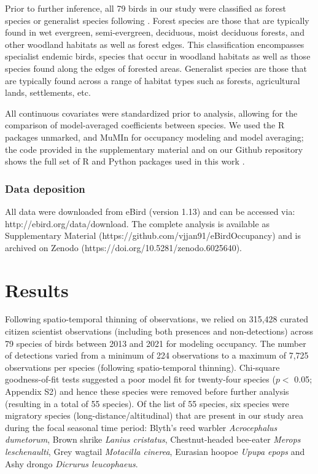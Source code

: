 Prior to further inference, all 79 birds in our study were classified as forest species or generalist species following \citep{ali1983a}.
Forest species are those that are typically found in wet evergreen, semi-evergreen, deciduous, moist deciduous forests, and other woodland habitats as well as forest edges.
This classification encompasses specialist endemic birds, species that occur in woodland habitats as well as those species found along the edges of forested areas.
Generalist species are those that are typically found across a range of habitat types such as forests, agricultural lands, settlements, etc.

All continuous covariates were standardized prior to analysis, allowing for the comparison of model-averaged coefficients between species.
We used the R packages unmarked, and MuMIn for occupancy modeling and model averaging; the code provided in the supplementary material and on our Github repository shows the full set of R and Python packages used in this work \citep{barton2009,fiske2011,r2020}.

\subsubsection*{Data deposition}

All data were downloaded from eBird (version 1.13) and can be accessed via: http://ebird.org/data/download.
The complete analysis is available as Supplementary Material (https://github.com/vjjan91/eBirdOccupancy) and is archived on Zenodo (https://doi.org/10.5281/zenodo.6025640).

\section*{Results}

Following spatio-temporal thinning of observations, we relied on 315,428 curated citizen scientist observations (including both presences and non-detections) across 79 species of birds between 2013 and 2021 for modeling occupancy.
The number of detections varied from a minimum of 224 observations to a maximum of 7,725 observations per species (following spatio-temporal thinning).
Chi-square goodness-of-fit tests suggested a poor model fit for twenty-four species ($p <$ 0.05; Appendix S2) and hence these species were removed before further analysis (resulting in a total of 55 species).
Of the list of 55 species, six species were migratory species (long-distance/altitudinal) that are present in our study area during the focal seasonal time period: Blyth's reed warbler \textit{Acrocephalus dumetorum}, Brown shrike \textit{Lanius cristatus}, Chestnut-headed bee-eater \textit{Merops leschenaulti}, Grey wagtail \textit{Motacilla cinerea}, Eurasian hoopoe \textit{Upupa epops} and Ashy drongo \textit{Dicrurus leucophaeus}.

